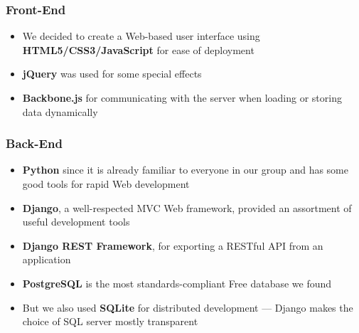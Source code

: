 
\begin{frame}
  \frametitle{Front-End}

  \begin{itemize}[<+>]
    \item We decided to create a Web-based user interface using
      \textbf{HTML5/CSS3/JavaScript} for ease of deployment

    \item \textbf{jQuery} was used for some special effects

    \item \textbf{Backbone.js} for communicating with the server when
      loading or storing data dynamically
  \end{itemize}
\end{frame}

\begin{frame}
  \frametitle{Back-End}

  \begin{itemize}[<+>]
    \item \textbf{Python} since it is already familiar to everyone in
      our group and has some good tools for rapid Web development

    \item \textbf{Django}, a well-respected MVC Web framework,
      provided an assortment of useful development tools

    \item \textbf{Django REST Framework}, for exporting a RESTful
      API from an application

    \item \textbf{PostgreSQL} is the most standards-compliant Free database we
      found

    \item But we also used \textbf{SQLite} for distributed development ---
      Django makes the choice of SQL server mostly transparent
  \end{itemize}
\end{frame}

